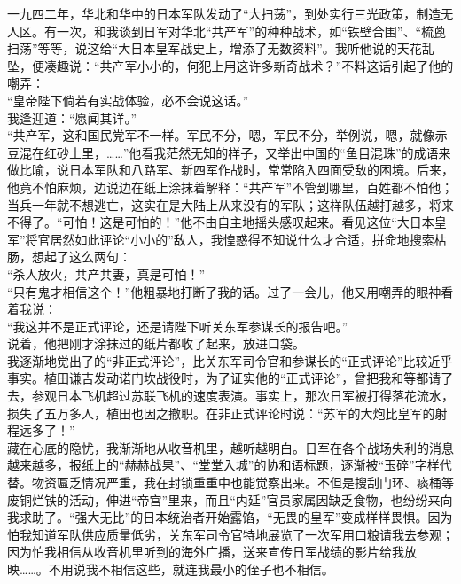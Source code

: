 一九四二年，华北和华中的日本军队发动了“大扫荡”，到处实行三光政策，制造无人区。有一次，和我谈到日军对华北“共产军”的种种战术，如“铁壁合围”、“梳蓖扫荡”等等，说这给“大日本皇军战史上，增添了无数资料”。我听他说的天花乱坠，便凑趣说：“共产军小小的，何犯上用这许多新奇战术？”不料这话引起了他的嘲弄：\\

“皇帝陛下倘若有实战体验，必不会说这话。”\\

我逢迎道：“愿闻其详。”\\

“共产军，这和国民党军不一样。军民不分，嗯，军民不分，举例说，嗯，就像赤豆混在红砂土里，……”他看我茫然无知的样子，又举出中国的“鱼目混珠”的成语来做比喻，说日本军队和八路军、新四军作战时，常常陷入四面受敌的困境。后来，他竟不怕麻烦，边说边在纸上涂抹着解释：“共产军”不管到哪里，百姓都不怕他；当兵一年就不想逃亡，这实在是大陆上从来没有的军队；这样队伍越打越多，将来不得了。“可怕！这是可怕的！”他不由自主地摇头感叹起来。看见这位“大日本皇军”将官居然如此评论“小小的”敌人，我惶惑得不知说什么才合适，拼命地搜索枯肠，想起了这么两句：\\

“杀人放火，共产共妻，真是可怕！”\\

“只有鬼才相信这个！”他粗暴地打断了我的话。过了一会儿，他又用嘲弄的眼神看着我说：\\

“我这并不是正式评论，还是请陛下听关东军参谋长的报告吧。”\\

说着，他把刚才涂抹过的纸片都收了起来，放进口袋。\\

我逐渐地觉出了的“非正式评论”，比关东军司令官和参谋长的“正式评论”比较近乎事实。植田谦吉发动诺门坎战役时，为了证实他的“正式评论”，曾把我和等都请了去，参观日本飞机超过苏联飞机的速度表演。事实上，那次日军被打得落花流水，损失了五万多人，植田也因之撤职。在非正式评论时说：“苏军的大炮比皇军的射程远多了！”\\

藏在心底的隐忧，我渐渐地从收音机里，越听越明白。日军在各个战场失利的消息越来越多，报纸上的“赫赫战果”、“堂堂入城”的协和语标题，逐渐被“玉碎”字样代替。物资匾乏情况严重，我在封锁重重中也能觉察出来。不但是搜刮门环、痰桶等废铜烂铁的活动，伸进“帝宫”里来，而且“内延”官员家属因缺乏食物，也纷纷来向我求助了。“强大无比”的日本统治者开始露馅，“无畏的皇军”变成样样畏惧。因为怕我知道军队供应质量低劣，关东军司令官特地展览了一次军用口粮请我去参观；因为怕我相信从收音机里听到的海外广播，送来宣传日军战绩的影片给我放映……。不用说我不相信这些，就连我最小的侄子也不相信。\\

